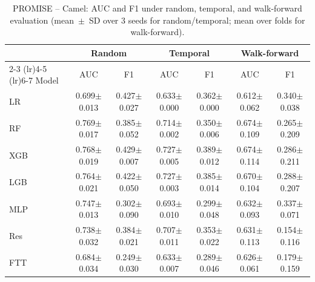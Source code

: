\begin{table}[htbp]
\centering
\caption{PROMISE -- Camel: AUC and F1 under random, temporal, and walk-forward evaluation (mean~$\pm$~SD over 3 seeds for random/temporal; mean over folds for walk-forward).}
\label{tab:supp-camel}
\scriptsize
\begin{tabular}{l cc cc cc}
\toprule
 & \multicolumn{2}{c}{Random} & \multicolumn{2}{c}{Temporal} & \multicolumn{2}{c}{Walk-forward} \\
\cmidrule(lr){2-3} \cmidrule(lr){4-5} \cmidrule(lr){6-7}
Model & AUC & F1 & AUC & F1 & AUC & F1 \\
\midrule
LR & 0.699$\pm$0.013 & 0.427$\pm$0.027 & 0.633$\pm$0.000 & 0.362$\pm$0.000 & 0.612$\pm$0.062 & 0.340$\pm$0.038 \\
RF & 0.769$\pm$0.017 & 0.385$\pm$0.052 & 0.714$\pm$0.002 & 0.350$\pm$0.006 & 0.674$\pm$0.109 & 0.265$\pm$0.209 \\
XGB & 0.768$\pm$0.019 & 0.429$\pm$0.007 & 0.727$\pm$0.005 & 0.389$\pm$0.012 & 0.674$\pm$0.114 & 0.286$\pm$0.211 \\
LGB & 0.764$\pm$0.021 & 0.422$\pm$0.050 & 0.727$\pm$0.003 & 0.385$\pm$0.014 & 0.670$\pm$0.104 & 0.288$\pm$0.207 \\
MLP & 0.747$\pm$0.013 & 0.302$\pm$0.090 & 0.693$\pm$0.010 & 0.299$\pm$0.048 & 0.632$\pm$0.093 & 0.337$\pm$0.071 \\
Res & 0.738$\pm$0.032 & 0.384$\pm$0.021 & 0.707$\pm$0.011 & 0.353$\pm$0.022 & 0.631$\pm$0.113 & 0.154$\pm$0.116 \\
FTT & 0.684$\pm$0.034 & 0.249$\pm$0.030 & 0.633$\pm$0.007 & 0.289$\pm$0.046 & 0.626$\pm$0.061 & 0.179$\pm$0.159 \\
\bottomrule
\end{tabular}
\end{table}

